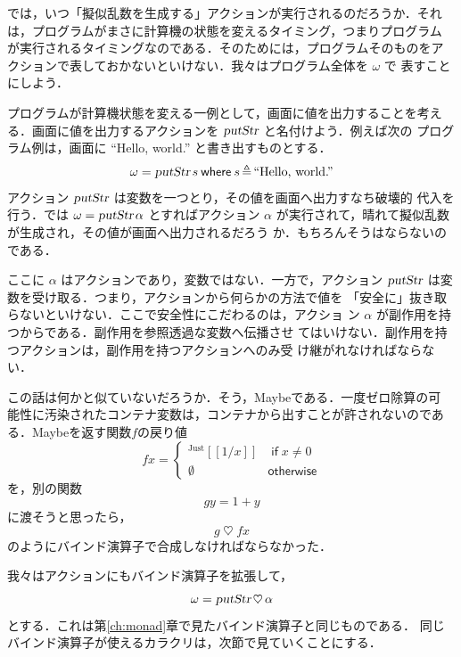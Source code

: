 \documentclass[a5paper,twoside,fleqn]{jsbook}
\def\[{\left[\!\left[}
\def\]{\right]\!\right]}
\newcommand{\mKeyword}[1]{\mathsf{#1}} %
\newcommand{\mIfKeyword}{\mKeyword{if}}
\newcommand{\mOtherwiseKeyword}{\mKeyword{otherwise}}
\newcommand{\mWhereKeyword}{\mKeyword{where}}
\DeclareMathOperator{\mIf}{\mIfKeyword}
\DeclareMathOperator{\mOtherwise}{\mOtherwiseKeyword}
\newcommand{\mNothing}{\emptyset}
\newcommand{\mString}[1]{\text{#1}}
\newcommand{\mAction}[1]{\textsl{#1}}
\DeclareMathOperator{\mPutStr}{\mAction{putStr}}
\DeclareMathOperator{\mBind}{\heartsuit}
\DeclareMathOperator{\mLetEq}{\triangleq}
\newcommand{\mGenericValueConstructor}[1]{\mathrm{#1}}
\newcommand{\mGenericWith}[2]{{}^\mGenericValueConstructor{#1}\[#2\]}
\newcommand{\mJustWith}[1]{\mGenericWith{Just}{#1}}
\newcommand{\mWhereIs}[2]{\mathbin{\mWhereKeyword}#1\mLetEq#2}
\begin{document}
では，いつ「擬似乱数を生成する」アクションが実行されるのだろうか．それ
は，プログラムがまさに計算機の状態を変えるタイミング，つまりプログラム
が実行されるタイミングなのである．そのためには，プログラムそのものをア
クションで表しておかないといけない．我々はプログラム全体を $\omega$ で
表すことにしよう．

プログラムが計算機状態を変える一例として，画面に値を出力することを考え
る．画面に値を出力するアクションを $\mPutStr$ と名付けよう．例えば次の
プログラム例は，画面に ``Hello, world.'' と書き出すものとする．
\begin{equation}
\omega=\mPutStr s\mWhereIs{s}{\mString{``Hello, world.''}}
\end{equation}
アクション $\mPutStr$ は変数を一つとり，その値を画面へ出力すなち破壊的
代入を行う．では $\omega=\mPutStr\alpha$ とすればアクション $\alpha$
が実行されて，晴れて擬似乱数が生成され，その値が画面へ出力されるだろう
か．もちろんそうはならないのである．

ここに $\alpha$ はアクションであり，変数ではない．一方で，アクション
$\mPutStr$ は変数を受け取る．つまり，アクションから何らかの方法で値を
「安全に」抜き取らないといけない．ここで安全性にこだわるのは，アクショ
ン $\alpha$ が副作用を持つからである．副作用を参照透過な変数へ伝播させ
てはいけない．副作用を持つアクションは，副作用を持つアクションへのみ受
け継がれなければならない．

この話は何かと似ていないだろうか．そう，Maybeである．一度ゼロ除算の可
能性に汚染されたコンテナ変数は，コンテナから出すことが許されないのであ
る．Maybeを返す関数$f$の戻り値
\begin{equation}
fx=\begin{cases}
\mJustWith{1/x}&\mIf x\neq0\\
\mNothing&\mOtherwise
\end{cases}
\end{equation}
を，別の関数
\begin{equation}
gy=1+y
\end{equation}
に渡そうと思ったら，
\begin{equation}
g\mBind fx
\end{equation}
のようにバインド演算子で合成しなければならなかった．

我々はアクションにもバインド演算子を拡張して，
\begin{equation}
\omega=\mPutStr\mBind\alpha
\end{equation}
とする．これは第\ref{ch:monad}章で見たバインド演算子と同じものである．
同じバインド演算子が使えるカラクリは，次節で見ていくことにする．
\end{document}
